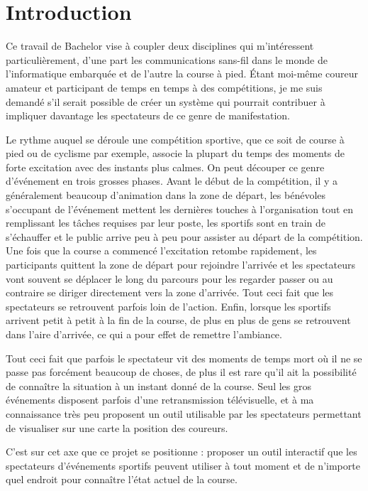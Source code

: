 \chapter{Introduction}

Ce travail de Bachelor vise à coupler deux disciplines qui m’intéressent particulièrement, d’une part les communications sans-fil dans le monde de l’informatique embarquée et de l’autre la course à pied. Étant moi-même coureur amateur et participant de temps en temps à des compétitions, je me suis demandé s’il serait possible de créer un système qui pourrait contribuer à impliquer davantage les spectateurs de ce genre de manifestation.

Le rythme auquel se déroule une compétition sportive, que ce soit de course à pied ou de cyclisme par exemple, associe la plupart du temps des moments de forte excitation avec des instants plus calmes. On peut découper ce genre d’événement en trois grosses phases. Avant le début de la compétition, il y a généralement beaucoup d’animation dans la zone de départ, les bénévoles s’occupant de l’événement mettent les dernières touches à l’organisation tout en remplissant les tâches requises par leur poste, les sportifs sont en train de s’échauffer et le public arrive peu à peu pour assister au départ de la compétition. Une fois que la course a commencé l’excitation retombe rapidement, les participants quittent la zone de départ pour rejoindre l’arrivée et les spectateurs vont souvent se déplacer le long du parcours pour les regarder passer ou au contraire se diriger directement vers la zone d’arrivée. Tout ceci fait que les spectateurs se retrouvent parfois loin de l’action. Enfin, lorsque les sportifs arrivent petit à petit à la fin de la course, de plus en plus de gens se retrouvent dans l’aire d’arrivée, ce qui a pour effet de remettre l’ambiance.

Tout ceci fait que parfois le spectateur vit des moments de temps mort où il ne se passe pas forcément beaucoup de choses, de plus il est rare qu’il ait la possibilité de connaître la situation à un instant donné de la course. Seul les gros événements disposent parfois d’une retransmission télévisuelle, et à ma connaissance très peu proposent un outil utilisable par les spectateurs permettant de visualiser sur une carte la position des coureurs.

C’est sur cet axe que ce projet se positionne : proposer un outil interactif que les spectateurs d’événements sportifs peuvent utiliser à tout moment et de n’importe quel endroit pour connaître l’état actuel de la course.
